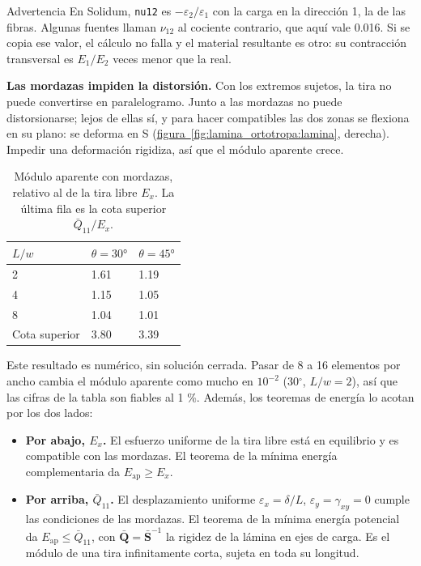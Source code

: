 \documentclass[11pt,oneside]{report}
\begin{document}
\begin{warnbox}{Advertencia}
En Solidum, \texttt{nu12} es $-\varepsilon_2/\varepsilon_1$ con la carga en la dirección 1, la de las fibras. Algunas fuentes llaman $\nu_{12}$ al cociente contrario, que aquí vale 0.016. Si se copia ese valor, el cálculo no falla y el material resultante es otro: su contracción transversal es $E_1/E_2$ veces menor que la real.
\end{warnbox}

\textbf{Las mordazas impiden la distorsión.} Con los extremos sujetos, la tira no puede convertirse en paralelogramo. Junto a las mordazas no puede distorsionarse; lejos de ellas sí, y para hacer compatibles las dos zonas se flexiona en su plano: se deforma en S (\hyperref[fig:lamina_ortotropa:lamina]{figura~\ref*{fig:lamina_ortotropa:lamina}}, derecha). Impedir una deformación rigidiza, así que el módulo aparente crece.

\begin{table}[h]
\centering
\caption{Módulo aparente con mordazas, relativo al de la tira libre $E_x$. La última fila es la cota superior $\bar Q_{11}/E_x$.}
\begin{tabularx}{\textwidth}{YYY}
\hline
\textbf{$L/w$} & \textbf{$\theta = 30°$} & \textbf{$\theta = 45°$} \\
 & 1.61 & 1.19 \\
4 & 1.15 & 1.05 \\
8 & 1.04 & 1.01 \\
Cota superior & 3.80 & 3.39 \\
\hline
\end{tabularx}
\end{table}
Este resultado es numérico, sin solución cerrada. Pasar de 8 a 16 elementos por ancho cambia el módulo aparente como mucho en $10^{-2}$ (30\ensuremath{^{\circ}}, $L/w = 2$), así que las cifras de la tabla son fiables al 1 \%. Además, los teoremas de energía lo acotan por los dos lados:

\begin{itemize}
  \item \textbf{Por abajo, $E_x$.} El esfuerzo uniforme de la tira libre está en equilibrio y es compatible con las mordazas. El teorema de la mínima energía complementaria da $E_{\mathrm{ap}} \ge E_x$.
  \item \textbf{Por arriba, $\bar Q_{11}$.} El desplazamiento uniforme $\varepsilon_x = \delta/L$, $\varepsilon_y = \gamma_{xy} = 0$ cumple las condiciones de las mordazas. El teorema de la mínima energía potencial da $E_{\mathrm{ap}} \le \bar Q_{11}$, con $\bar{\mathbf Q} = \bar{\mathbf S}^{-1}$ la rigidez de la lámina en ejes de carga. Es el módulo de una tira infinitamente corta, sujeta en toda su longitud.
\end{itemize}
\end{document}
